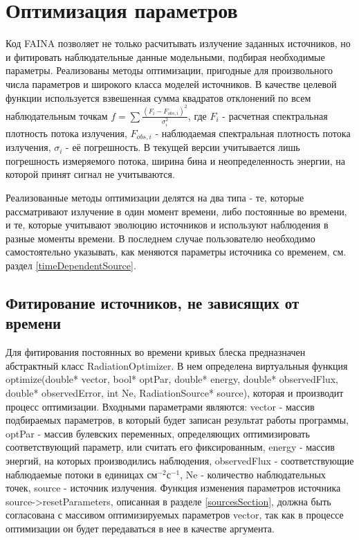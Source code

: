 \chapter{Оптимизация параметров}\label{optimization}
Код FAINA позволяет не только расчитывать излучение заданных источников, но и фитировать наблюдательные данные модельными, подбирая необходимые параметры. Реализованы методы оптимизации, пригодные для произвольного числа параметров и широкого класса моделей источников. В качестве целевой функции используется взвешенная сумма квадратов отклонений по всем наблюдательным точкам $f = \sum \frac{(F_i - F_{obs,i})^2}{\sigma_i^2}$, где $F_i$ - расчетная спектральная плотность потока излучения, $F_{obs,i}$ - наблюдаемая спектральная плотность потока излучения, $\sigma_i$ - её погрешность. В текущей версии учитывается лишь погрешность измеряемого потока, ширина бина и неопределенность энергии, на которой принят сигнал не учитываются.

Реализованные методы оптимизации делятся на два типа - те, которые рассматривают излучение в один момент времени, либо постоянные во времени, и те, которые учитывают эволюцию источников и используют наблюдения в разные моменты времени. В последнем случае пользователю необходимо самостоятельно указывать, как меняются параметры источника со временем, см. раздел \ref{timeDependentSource}.

\section{Фитирование источников, не зависящих от времени}
Для фитирования постоянных во времени кривых блеска предназначен абстрактный класс RadiationOptimizer. В нем определена виртуальныя функция optimize(double* vector, bool* optPar, double* energy, double* observedFlux, double* observedError, int Ne, RadiationSource* source), которая и производит процесс оптимизации. Входными параметрами являются: vector - массив подбираемых параметров, в который будет записан результат работы программы, optPar - массив булевских переменных, определяющих оптимизировать соответствующий параметр, или считать его фиксированным, energy - массив энергий, на которых производились наблюдения, observedFlux - соответствующие наблюдаемые потоки в единицах $\text{см}^{-2}\text{с}^{-1}$, Ne - количество наблюдательных точек, source - источник излучения. Функция изменения параметров источника source->resetParameters, описанная в разделе \ref{sourcesSection}, должна быть согласована с массивом оптимизируемых параметров vector, так как в процессе оптимизации он будет передаваться в нее в качестве аргумента.

